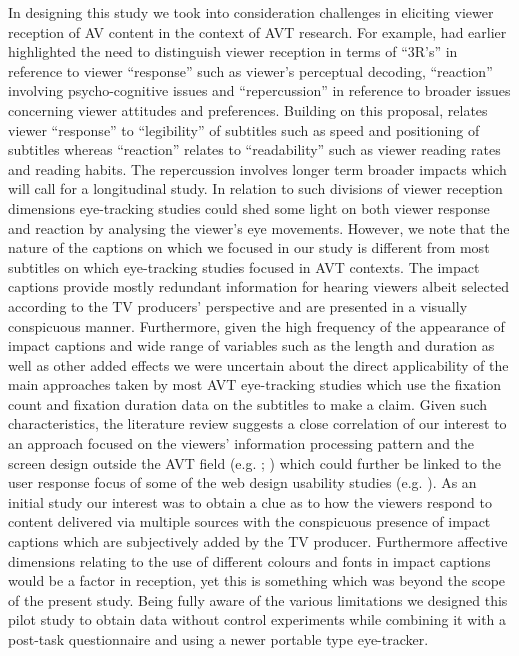 \documentclass[output=paper]{langsci/langscibook}
\begin{document}
In designing this study we took into consideration challenges in eliciting viewer reception of AV content in the context of AVT research.  For example, \citet{kovacic1995} had earlier highlighted the need to distinguish viewer reception in terms of ``3R's'' in reference to viewer ``response'' such as viewer's perceptual decoding, ``reaction'' involving psycho-cognitive issues and ``repercussion'' in reference to broader issues concerning viewer attitudes and preferences. Building on this proposal, \citet[56--57]{gambier2013} relates viewer ``response'' to ``legibility'' of subtitles such as speed and positioning of subtitles whereas ``reaction'' relates to ``readability'' such as viewer reading rates and reading habits. The repercussion involves longer term broader impacts which will call for a longitudinal study.  In relation to such divisions of viewer reception dimensions eye-tracking studies could shed some light on both viewer response and reaction by analysing the viewer's eye movements.  However, we note that the nature of the captions on which we focused in our study is different from most subtitles on which eye-tracking studies focused in AVT contexts. The impact captions provide mostly redundant information for hearing viewers albeit selected according to the TV producers' perspective and are presented in a visually conspicuous manner. Furthermore, given the high frequency of the appearance of impact captions and wide range of variables such as the length and duration as well as other added effects we were uncertain about the direct applicability of the main approaches taken by most AVT eye-tracking studies which use the fixation count and fixation duration data on the subtitles to make a claim.  Given such characteristics, the literature review suggests a close correlation of our interest to an approach focused on the viewers' information processing pattern and the screen design outside the AVT field (e.g. \citealt{josephson2006}; \citealt{Matsukawa2009}) which could further be linked to the user response focus of some of the web design usability studies (e.g. \citealt{Nielsen2010}). As an initial study our interest was to obtain a clue as to how the viewers respond to content delivered via multiple sources with the conspicuous presence of impact captions which are subjectively added by the TV producer. Furthermore affective dimensions relating to the use of different colours and fonts in impact captions would be a factor in reception, yet this is something which was beyond the scope of the present study. Being fully aware of the various limitations we designed this pilot study to obtain data without control experiments while combining it with a post-task questionnaire and using a newer portable type eye-tracker. 
\end{document}
